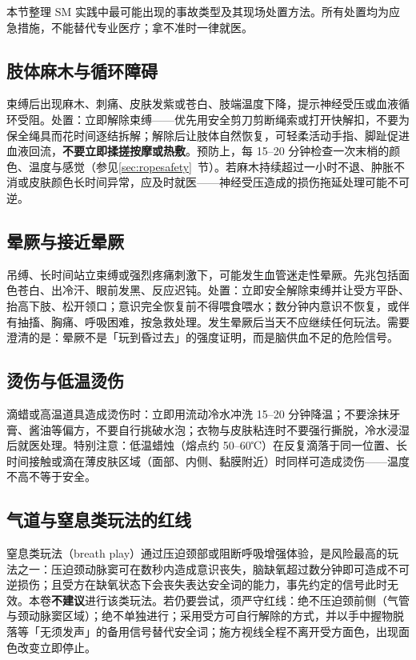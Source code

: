 \documentclass[12pt,UTF8]{ctexbook}
\begin{document}
本节整理 SM 实践中最可能出现的事故类型及其现场处置方法。所有处置均为应急措施，不能替代专业医疗；拿不准时一律就医。

\subsection{肢体麻木与循环障碍}

束缚后出现麻木、刺痛、皮肤发紫或苍白、肢端温度下降，提示神经受压或血液循环受阻。处置：立即解除束缚——优先用安全剪刀剪断绳索或打开快解扣，不要为保全绳具而花时间逐结拆解；解除后让肢体自然恢复，可轻柔活动手指、脚趾促进血液回流，\textbf{不要立即揉搓按摩或热敷}。预防上，每 15--20 分钟检查一次末梢的颜色、温度与感觉（参见\ref{sec:ropesafety}~节）。若麻木持续超过一小时不退、肿胀不消或皮肤颜色长时间异常，应及时就医——神经受压造成的损伤拖延处理可能不可逆。

\subsection{晕厥与接近晕厥}

吊缚、长时间站立束缚或强烈疼痛刺激下，可能发生血管迷走性晕厥。先兆包括面色苍白、出冷汗、眼前发黑、反应迟钝。处置：立即安全解除束缚并让受方平卧、抬高下肢、松开领口；意识完全恢复前不得喂食喂水；数分钟内意识不恢复，或伴有抽搐、胸痛、呼吸困难，按急救处理。发生晕厥后当天不应继续任何玩法。需要澄清的是：晕厥不是「玩到昏过去」的强度证明，而是脑供血不足的危险信号。

\subsection{烫伤与低温烫伤}

滴蜡或高温道具造成烫伤时：立即用流动冷水冲洗 15--20 分钟降温；不要涂抹牙膏、酱油等偏方，不要自行挑破水泡；衣物与皮肤粘连时不要强行撕脱，冷水浸湿后就医处理。特别注意：低温蜡烛（熔点约 50--60℃）在反复滴落于同一位置、长时间接触或滴在薄皮肤区域（面部、内侧、黏膜附近）时同样可造成烫伤——温度不高不等于安全。

\subsection{气道与窒息类玩法的红线}

窒息类玩法（breath play）通过压迫颈部或阻断呼吸增强体验，是风险最高的玩法之一：压迫颈动脉窦可在数秒内造成意识丧失，脑缺氧超过数分钟即可造成不可逆损伤；且受方在缺氧状态下会丧失表达安全词的能力，事先约定的信号此时无效。本卷\textbf{不建议}进行该类玩法。若仍要尝试，须严守红线：绝不压迫颈前侧（气管与颈动脉窦区域）；绝不单独进行；采用受方可自行解除的方式，并以手中握物脱落等「无须发声」的备用信号替代安全词；施方视线全程不离开受方面色，出现面色改变立即停止。
\end{document}
